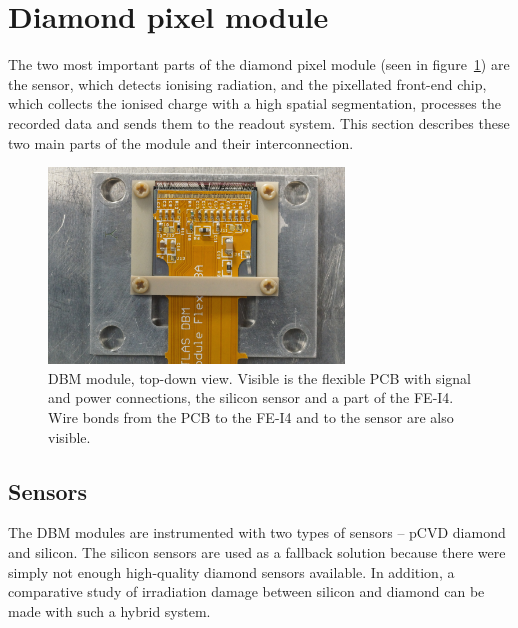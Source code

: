 \documentclass[twoside,12pt]{packages/mytustyle}  %
\begin{document}
\section{Diamond pixel module}
\label{sec:atlasdbm}
The two most important parts of the diamond pixel module (seen in figure~\ref{fig:dbmmodule}) are the sensor, which detects ionising radiation, and the pixellated front-end chip, which collects the ionised charge with a high spatial segmentation, processes the recorded data and sends them to the readout system. This section describes these two main parts of the module and their interconnection.
\begin{figure}[!t]
\centering
\includegraphics[width=0.7\textwidth]{pics/mod1}
\caption{DBM module, top-down view. Visible is the flexible PCB with signal and power connections, the silicon sensor and a part of the FE-I4. Wire bonds from the PCB to the FE-I4 and to the sensor are also visible.}
\label{fig:dbmmodule}
\end{figure}
\subsection{Sensors}
The DBM modules are instrumented with two types of sensors -- pCVD diamond and silicon. The silicon sensors are used as a fallback solution because there were simply not enough high-quality diamond sensors available. In addition, a comparative study of irradiation damage between silicon and diamond can be made with such a hybrid system.
\end{document}
